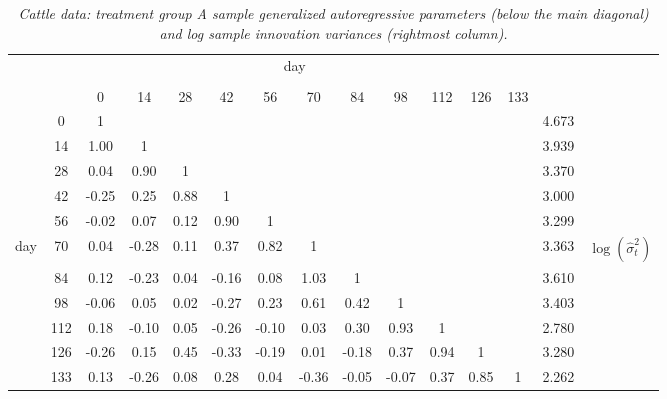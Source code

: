 \begin{table}[H] 
\begin{center}
\begin{tabular}{lc|ccccccccccc|cr}
 \multicolumn{14}{c}{day} \\
&&&&&&&&&&&&\\
& &  0 & 14 & 28 & 42 & 56 & 70 & 84 & 98 & 112 & 126 & 133  \\ 
  \cline{2-13}\noalign{\smallskip}  
&0 & 1 & &&&&&&&&& & 4.673& \\ 
&  14& 1.00 & 1&&&&&&&&&& 3.939 &\\ 
&  28 & 0.04 & 0.90 & 1 &&&&&&&&& 3.370&\\ 
&  42 & -0.25 & 0.25 & 0.88 & 1 &&&&&&&&3.000& \\ 
&  56 & -0.02 & 0.07 & 0.12 & 0.90 &1 &&&&&&& 3.299&\\ 
day &  70 & 0.04 & -0.28 & 0.11 & 0.37 & 0.82  &1&&&&&& 3.363 & $\log\left(\hat{\sigma}^2_t\right)$\\ 
 & 84 & 0.12 & -0.23 & 0.04 & -0.16 & 0.08 & 1.03  &1&&&&& 3.610\\ 
 & 98 & -0.06 & 0.05 & 0.02 & -0.27 & 0.23 & 0.61 & 0.42 &1&&&& 3.403&\\ 
 & 112 & 0.18 & -0.10 & 0.05 & -0.26 & -0.10 & 0.03 & 0.30 & 0.93&1&&& 2.780&  \\ 
 & 126 & -0.26 & 0.15 & 0.45 & -0.33 & -0.19 & 0.01 & -0.18 & 0.37 & 0.94 &1&&3.280& \\ 
 & 133 & 0.13 & -0.26 & 0.08 & 0.28 & 0.04 & -0.36 & -0.05 & -0.07 & 0.37 & 0.85 & 1  &2.262&\\ 
\end{tabular} 
\caption{\textit{Cattle data: treatment group A sample generalized autoregressive parameters (below the main diagonal) and log sample innovation variances (rightmost column).}}\label{table:sample-regressogram-garps}
\end{center}
\end{table}

